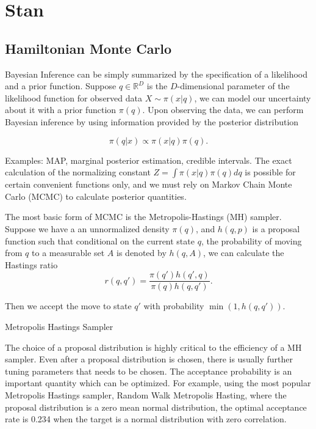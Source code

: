 \documentclass[12pt]{report}
\begin{document}
\chapter{Stan}
\section{Hamiltonian Monte Carlo}

Bayesian Inference can be simply summarized by the specification of a likelihood and a prior function. Suppose $q \in \mathbb{R}^D$ is the $D$-dimensional parameter of the likelihood function for observed data $X \sim \pi(x|q)$, we can
model our uncertainty about it with a prior function $\pi(q)$. Upon observing the data, we can perform Bayesian inference by using information provided by the posterior distribution 

\[ \pi(q | x ) \propto \pi(x | q) \pi(q) .\]

Examples: MAP, marginal posterior estimation, credible intervals. The exact calculation of the normalizing constant $Z = \int \pi(x | q) \pi(q) dq $ is possible for certain convenient functions only, and we must rely on Markov Chain Monte Carlo (MCMC) to calculate posterior quantities. 


The most basic form of MCMC is the Metropolis-Hastings (MH) sampler. Suppose we have a an unnormalized density $\pi(q)$, and $h(q,p)$ is a proposal function such that conditional on the current state $q$, the probability of moving from $q$ to a measurable set $A$ is denoted by $h(q,A)$, we can calculate the Hastings ratio
\[ r(q,q') = \frac{\pi(q')h(q',q)}{\pi(q)h(q,q')}. \]

Then we accept the move to state $q'$ with probability $ \min (1, h(q,q')) $.

\begin{algorithm}
\caption{Metropolis Hastings Sampler}


 
 
\end{algorithm}


The choice of a proposal distribution is highly critical to the efficiency of a MH sampler. Even after a proposal distribution is chosen, there is usually further tuning parameters that needs to be chosen. The acceptance probability is an important quantity which 
can be optimized. For example, using the most popular Metropolis Hastings sampler, Random Walk Metropolis Hasting, where the proposal distribution is a zero mean normal distribution,
the optimal acceptance rate is 0.234 when the target is a normal distribution with zero correlation.\cite{roberts1997weak,gelman1996efficient,roberts2001optimal} 
\end{document}
